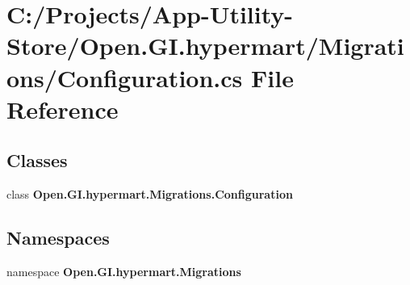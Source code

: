\section{C\+:/\+Projects/\+App-\/\+Utility-\/\+Store/\+Open.G\+I.\+hypermart/\+Migrations/\+Configuration.cs File Reference}
\label{_configuration_8cs}
\subsection*{Classes}
\begin{DoxyCompactItemize}
\item 
class {\bfseries Open.\+G\+I.\+hypermart.\+Migrations.\+Configuration}
\end{DoxyCompactItemize}
\subsection*{Namespaces}
\begin{DoxyCompactItemize}
\item 
namespace \textbf{ Open.\+G\+I.\+hypermart.\+Migrations}
\end{DoxyCompactItemize}
